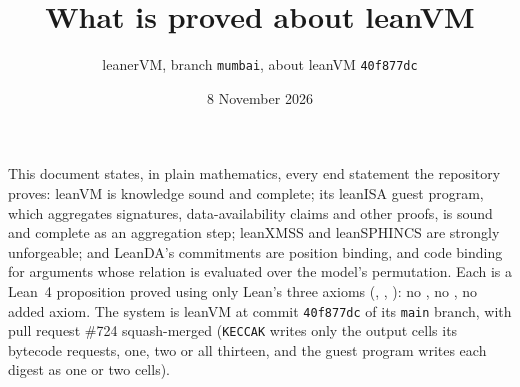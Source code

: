 \documentclass[11pt]{article}
\title{What is proved about leanVM}
\author{leanerVM, branch \texttt{mumbai}, about leanVM \texttt{40f877dc}}
\date{8 November 2026}
\begin{document}
\maketitle

\noindent This document states, in plain mathematics, every end statement the repository proves:
leanVM is knowledge sound and complete; its leanISA guest program, which aggregates signatures,
data-availability claims and other proofs, is sound and complete as an aggregation step; leanXMSS
and leanSPHINCS are strongly unforgeable; and LeanDA's commitments are position binding, and code
binding for arguments whose relation is evaluated over the model's permutation. Each is a Lean~4
proposition proved using only Lean's three axioms (, ,
): no , no , no added axiom. The system is
leanVM at commit \texttt{40f877dc} of its \texttt{main} branch, with pull request \#724 squash-merged
(\texttt{KECCAK} writes only the output cells its bytecode requests, one, two or all thirteen, and
the guest program writes each digest as one or two cells).
\end{document}
